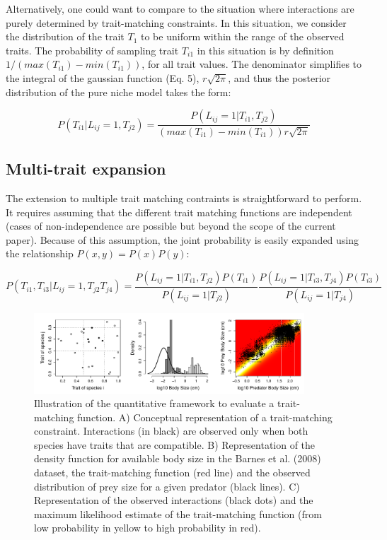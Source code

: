 \documentclass[11pt]{article}
\begin{document}
Alternatively, one could want to compare to the situation where interactions are purely determined by trait-matching constraints. In this situation, we consider the distribution of the trait $T_1$ to be uniform within the range of the observed traits. The probability of sampling trait $T_{i1}$ in this situation is by definition $1/(max(T_{i1})-min(T_{i1}))$, for all trait values. The denominator simplifies to the integral of the gaussian function (Eq. 5), $r\sqrt{2\pi}$, and thus the posterior distribution of the pure niche model takes the form: 

\begin{equation}  
	P(T_{i1}|L_{ij}=1,T_{j2})=\frac{P(L_{ij}=1|T_{i1},T_{j2})}{(max(T_{i1})-min(T_{i1}))r\sqrt{2\pi}}
\end{equation}

\subsection*{Multi-trait expansion}

The extension to multiple trait matching contraints is straightforward to perform. It requires assuming that the different trait matching functions are independent (cases of non-independence are possible but beyond the scope of the current paper). Because of this assumption, the joint probability is easily expanded using the relationship $P(x,y) = P(x)P(y)$:

\begin{equation}  
	P(T_{i1},T_{i3}|L_{ij}=1,T_{j2}T_{j4})=\frac{P(L_{ij}=1|T_{i1},T_{j2})P(T_{i1})}{P(L_{ij}=1|T_{j2})}\frac{P(L_{ij}=1|T_{i3},T_{j4})P(T_{i3})}{P(L_{ij}=1|T_{j4})}
\end{equation}

\begin{figure} 
\centering\includegraphics[width=0.9\textwidth]{fig_box2.pdf}
\caption{Illustration of the quantitative framework to evaluate a trait-matching function. A) Conceptual representation of a trait-matching constraint. Interactions (in black) are observed only when both species have traits that are compatible. B) Representation of the density function for available body size in the Barnes et al. (2008) dataset, the trait-matching function (red line) and the observed distribution of prey size for a given predator (black lines). C) Representation of the observed interactions (black dots) and the maximum likelihood estimate of the trait-matching function (from low probability in yellow to high probability in red). }
\end{figure}
\end{document}
